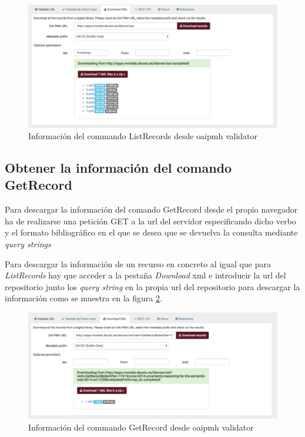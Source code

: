 \begin{figure}[!htbp]
	\centering
	\includegraphics[scale=0.31]{fig/download_oai/download_listrecords}
	\caption{Información del commando ListRecords desde \acrshort{oaipmh} validator}
	\label{fig:download_listrecords}
\end{figure}

\subsection{Obtener la información del comando GetRecord}

Para descargar la información del comando GetRecord desde el propio navegador ha de realizarse una petición GET a la \acrshort{url} del servidor especificando dicho verbo y el formato bibliográfico en el que se desea que se devuelva la consulta mediante \textit{query strings}

Para descargar la información de un recurso en concreto al igual que para \textit{ListRecords} hay que acceder a la pestaña \textit{Download} \acrshort{xml} e introducir la url del repositorio junto los \textit{query string} en la propia \acrshort{url} del repositorio para descargar la información como se muestra en la figura \ref{fig:download_getrecord}.

\begin{figure}[!htbp]
	\centering
	\includegraphics[scale=0.31]{fig/download_oai/download_getrecord}
	\caption{Información del commando GetRecord desde \acrshort{oaipmh} validator}
	\label{fig:download_getrecord}
\end{figure}

